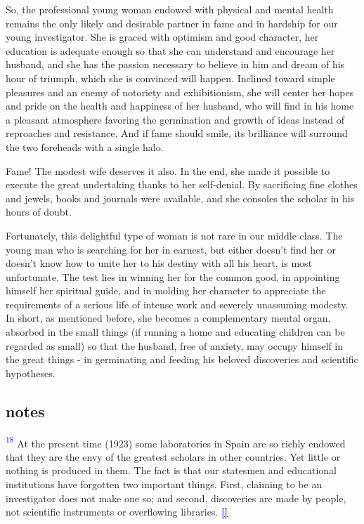 \documentclass{article}
\newcommand{\notetext}[2]{
 \par\noindent
 \hypertarget{note:#1}{\textsuperscript{\textcolor{blue}{#1}}} #2
 \hyperlink{ref:#1}{\textcolor{blue}{\textbf{[\textuparrow]}}}
 \par\vspace{1em}
}
\begin{document}
So, the professional young woman endowed with physical and mental health remains the only likely and desirable partner in fame and in hardship for our young investigator. She is graced with optimism and good character, her education is adequate enough so that she can understand and encourage her husband, and she has the passion necessary to believe in him and dream of his hour of triumph, which she is convinced will happen. Inclined toward simple pleasures and an enemy of notoriety and exhibitionism, she will center her hopes and pride on the health and happiness of her husband, who will find in his home a pleasant atmosphere favoring the germination and growth of ideas instead of reproaches and resistance. And if fame should smile, its brilliance will surround the two foreheads with a single halo.

Fame! The modest wife deserves it also. In the end, she made it possible to execute the great undertaking thanks to her self-denial. By sacrificing fine clothes and jewels, books and journals were available, and she consoles the scholar in his hours of doubt.

Fortunately, this delightful type of woman is not rare in our middle class. The young man who is searching for her in earnest, but either doesn’t find her or doesn’t know how to unite her to his destiny with all his heart, is most unfortunate. The test lies in winning her for the common good, in appointing himself her spiritual guide, and in molding her character to appreciate the requirements of a serious life of intense work and severely unassuming modesty. In short, as mentioned before, she becomes a complementary mental organ, absorbed in the small things (if running a home and educating children can be regarded as small) so that the husband, free of anxiety, may occupy himself in the great things - in germinating and feeding his beloved discoveries and scientific hypotheses.

\subsection*{notes}

\notetext{18}{ At the present time (1923) some laboratories in Spain are so richly endowed that they are the envy of the greatest scholars in other countries. Yet little or nothing is produced in them. The fact is that our statesmen and educational institutions have forgotten two important things. First, claiming to be an investigator does not make one so; and second, discoveries are made by people, not scientific instruments or overflowing libraries. }
\end{document}
